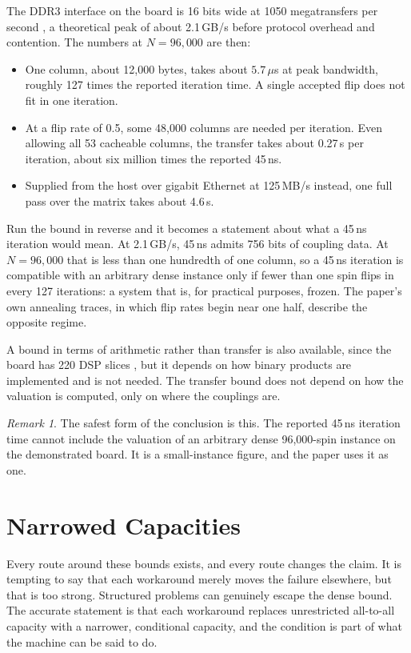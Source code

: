 \documentclass[11pt]{article}
\theoremstyle{definition}
\theoremstyle{remark}
\newtheorem*{remark}{Remark}
\begin{document}
The DDR3 interface on the board is 16 bits wide at 1050 megatransfers per second \cite{pynq}, a theoretical peak of about 2.1\,GB/s before protocol overhead and contention. The numbers at $N = 96{,}000$ are then:
\begin{itemize}
\item One column, about 12,000 bytes, takes about $5.7\,\mu$s at peak bandwidth, roughly 127 times the reported iteration time. A single accepted flip does not fit in one iteration.
\item At a flip rate of 0.5, some 48,000 columns are needed per iteration. Even allowing all 53 cacheable columns, the transfer takes about 0.27\,s per iteration, about six million times the reported 45\,ns.
\item Supplied from the host over gigabit Ethernet at 125\,MB/s instead, one full pass over the matrix takes about 4.6\,s.
\end{itemize}
Run the bound in reverse and it becomes a statement about what a 45\,ns iteration would mean. At 2.1\,GB/s, 45\,ns admits 756 bits of coupling data. At $N = 96{,}000$ that is less than one hundredth of one column, so a 45\,ns iteration is compatible with an arbitrary dense instance only if fewer than one spin flips in every 127 iterations: a system that is, for practical purposes, frozen. The paper's own annealing traces, in which flip rates begin near one half, describe the opposite regime.

A bound in terms of arithmetic rather than transfer is also available, since the board has 220 DSP slices \cite{pynq}, but it depends on how binary products are implemented and is not needed. The transfer bound does not depend on how the valuation is computed, only on where the couplings are.

\begin{remark}
The safest form of the conclusion is this. The reported 45\,ns iteration time cannot include the valuation of an arbitrary dense 96,000-spin instance on the demonstrated board. It is a small-instance figure, and the paper uses it as one.
\end{remark}

\section{Narrowed Capacities}

Every route around these bounds exists, and every route changes the claim. It is tempting to say that each workaround merely moves the failure elsewhere, but that is too strong. Structured problems can genuinely escape the dense bound. The accurate statement is that each workaround replaces unrestricted all-to-all capacity with a narrower, conditional capacity, and the condition is part of what the machine can be said to do.
\end{document}
